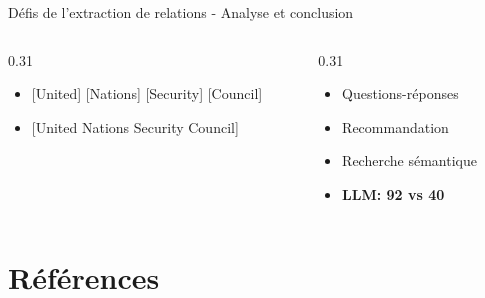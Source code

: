 \documentclass[10pt]{beamer}
\begin{document}
\begin{frame}{Défis de l'extraction de relations - Analyse et conclusion}
\begin{columns}[T]
        \begin{column}{0.31\textwidth}
    \begin{tcolorbox}[colback=middledered!20, colframe=darkred, title=Multi-mots]
        \begin{itemize}\scriptsize
            \item[$\times$] {\color{red}[United] [Nations] [Security] [Council]}
            \item[$\checkmark$] {\color{black}[United Nations Security Council]}
        \end{itemize}
    \end{tcolorbox}
\end{column}
        
        \begin{column}{0.31\textwidth}
            \begin{tcolorbox}[colback=lightred!20, colframe=redforsnnu, title=Applications]
                \begin{itemize}\scriptsize
                    \item Questions-réponses
                    \item Recommandation
                    \item Recherche sémantique
                    \item \textbf{LLM: 92 vs 40}
                \end{itemize}
            \end{tcolorbox}
        \end{column}
    \end{columns}
    
\end{frame}


\section{Références}
\end{document}
